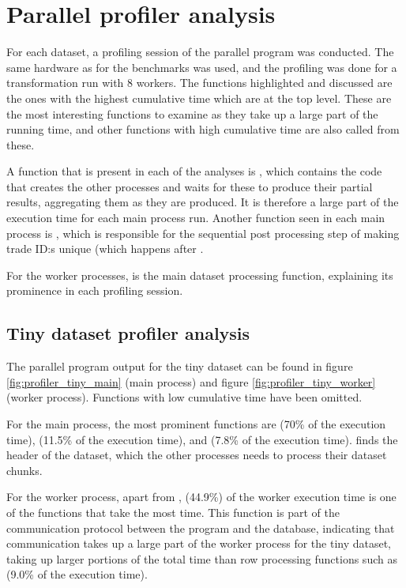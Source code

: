 \section{Parallel profiler analysis}
For each dataset, a profiling session of the parallel program was conducted. The same hardware as for the benchmarks was used, and
the profiling was done for a transformation run with 8 workers. The functions highlighted and discussed are the ones with the highest
cumulative time which are at the top level. These are the most interesting functions to examine as they take up a large part of the
running time, and other functions with high cumulative time are also called from these.

A function that is present in each of the analyses is , which contains the code that creates the
other processes and waits for these to produce their partial results, aggregating them as they are produced. It is therefore a large
part of the execution time for each main process run. Another function seen in each main process is ,
which is responsible for the sequential post processing step of making trade ID:s unique (which happens after .

For the worker processes,  is the main dataset processing function, explaining its prominence in each profiling session.

\subsection{Tiny dataset profiler analysis}
The parallel program  output for the tiny dataset can be found in figure \ref{fig:profiler_tiny_main} (main process)
and figure \ref{fig:profiler_tiny_worker} (worker process). Functions with low cumulative time have been omitted.

For the main process, the most prominent functions are  (70\% of the execution time),  (11.5\% of
the execution time), and  (7.8\% of the execution time).
 finds the header of the dataset, which the other processes needs to process their dataset chunks. 

For the worker process, apart from ,  (44.9\%) of the worker execution time
is one of the functions that take the most time. This function
is part of the communication protocol between the program and the database, indicating that communication takes up a large part of the
worker process for the tiny dataset, taking up larger portions of the total time than row processing functions such as  (9.0\% of the execution time).

